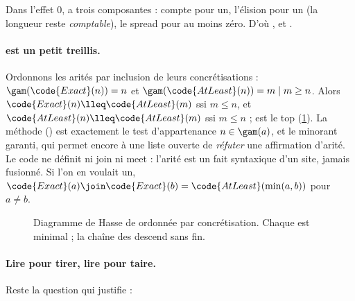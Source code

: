 
Dans l'effet 0, \code{[a, , ...b]} a trois composantes :  compte pour un, l'élision pour un (la longueur reste \emph{comptable}), le spread pour \og au moins zéro\fg{}. D'où ,  et .

\paragraph{ est un petit treillis.} Ordonnons les arités par inclusion de leurs concrétisations : $\gam(\code{Exact}(n)) = {n}$ et $\gam(\code{AtLeast}(n)) = {m \mid m \geq n}$. Alors $\code{Exact}(n) \lleq \code{AtLeast}(m)$ ssi $m \leq n$, et $\code{AtLeast}(n) \lleq \code{AtLeast}(m)$ ssi $m \leq n$ ;  est le top (\cref{fig:ir-arity}). La méthode  () est exactement le test d'appartenance $n \in \gam(a)$, et  le minorant garanti, qui permet encore à une liste ouverte de \emph{réfuter} une affirmation d'arité. Le code ne définit ni join ni meet : l'arité est un fait syntaxique d'un site, jamais fusionné. Si l'on en voulait un, $\code{Exact}(a) \join \code{Exact}(b) = \code{AtLeast}(\min(a,b))$ pour $a \neq b$.

\begin{figure}[htbp]\centering
{}
\caption{Diagramme de Hasse de  ordonnée par concrétisation. Chaque  est minimal ; la chaîne des  descend sans fin.}\label{fig:ir-arity}
\end{figure}

\paragraph{Lire pour tirer, lire pour taire.} Reste la question qui justifie  :

